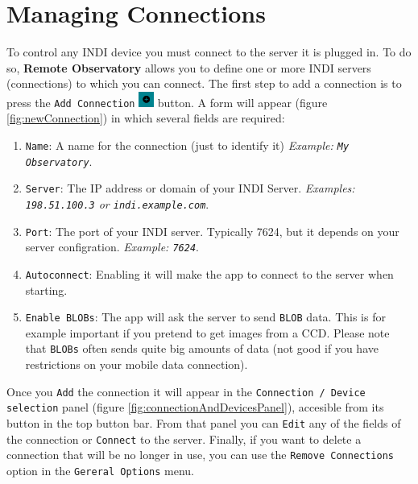                 
                

\label{manageConnections}
\section{Managing Connections}

To control any INDI device you must connect to the server it is plugged in. To do so, \textbf{Remote Observatory} allows you to define one or more INDI servers (connections) to which you can connect. The first step to add a connection is to press the \texttt{Add Connection} \includegraphics[width=0.5cm]{../images/addConnectionButton.png} button. A form will appear (figure \ref{fig:newConnection}) in which several fields are required:

\begin{enumerate}
  \item \texttt{Name}: A name for the connection (just to identify it) \textit{Example: \texttt{My Observatory}}.
  \item \texttt{Server}: The IP address or domain of your INDI Server. \textit{Examples: \texttt{198.51.100.3} or \texttt{indi.example.com}}.
  \item \texttt{Port}: The port of your INDI server. Typically 7624, but it depends on your server configration. \textit{Example: \texttt{7624}}.
  \item \texttt{Autoconnect}: Enabling it will make the app to connect to the server when starting.
  \item \texttt{Enable BLOBs}: The app will ask the server to send \texttt{BLOB} data. This is for example important if you pretend to get images from a CCD. Please note that \texttt{BLOBs} often sends quite big amounts of data (not good if you have restrictions on your mobile data connection).
\end{enumerate}

Once you \texttt{Add} the connection it will appear in the \texttt{Connection / Device selection} panel (figure \ref{fig:connectionAndDevicesPanel}), accesible from its button in the top button bar. From that panel you can \texttt{Edit} any of the fields of the connection or \texttt{Connect} to the server. Finally, if you want to delete a connection that will be no longer in use, you can use the \texttt{Remove Connections} option in the \texttt{Gereral Options} menu.


